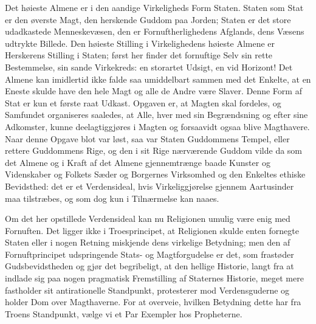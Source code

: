 \documentclass[12pt]{book}
\begin{document}
Det høieste Almene er i den aandige Virkeligheds Form Staten.
Staten som Stat er den øverste Magt, den herskende Guddom paa
Jorden; Staten er det store udadkastede Menneskevæsen, den er
Fornuftherlighedens
Afglands, dens Væsens udtrykte Billede. Den høieste Stilling i
Virkelighedens høieste Almene er Herskerens Stilling i Staten;
først her finder det fornuftige Selv sin rette Bestemmelse, sin
sande Virkekreds: en storartet Udsigt, en vid Horizont! Det Almene
kan imidlertid ikke falde saa umiddelbart sammen med det Enkelte, at
en Eneste skulde have den hele Magt og alle de Andre være Slaver.
Denne Form af Stat er kun et første raat Udkast. Opgaven er, at
Magten skal fordeles, og Samfundet organiseres saaledes, at Alle,
hver med sin Begrændsning og efter sine Adkomster, kunne
deelagtiggjøres i Magten og forsaavidt ogsaa blive Magthavere. Naar
denne Opgave blot var løst, saa var Staten Guddommens Tempel, eller
rettere Guddommens Rige, og den i sit Rige nærværende Guddom vilde
da som det Almene og i Kraft af det Almene gjennemtrænge baade
Kunster og Videnskaber og Folkets Sæder og Borgernes Virksomhed og
den Enkeltes ethiske Bevidsthed: det er et Verdensideal, hvis
Virkeliggjørelse gjennem Aartusinder maa tilstræbes, og som dog kun
i Tilnærmelse kan naaes.

Om det her opstillede Verdensideal kan nu Religionen umulig være
enig med Fornuften. Det ligger ikke i Troesprincipet, at Religionen
skulde enten fornegte Staten eller i nogen Retning miskjende dens
virkelige Betydning; men den af Fornuftprincipet udspringende Stats-
og Magtforgudelse er det, som frastøder Gudsbevidstheden og gjør det
begribeligt, at den hellige Historie, langt fra at indlade sig paa
nogen pragmatisk Fremstilling af Staternes Historie, meget mere
fastholder sit antirationelle Standpunkt, protesterer mod
Verdensguderne og holder Dom over Magthaverne. For at overveie,
hvilken Betydning dette har fra Troens Standpunkt, vælge vi et Par
Exempler hos Propheterne.
\end{document}

